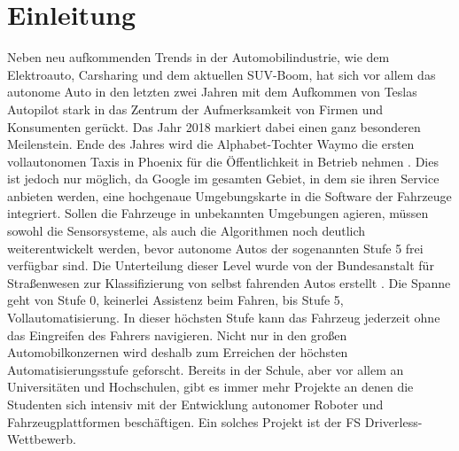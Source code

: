 \documentclass{like}
\begin{document}
  








\setcounter{page}{1}   %

\chapter{Einleitung}
Neben neu aufkommenden Trends in der Automobilindustrie, wie dem Elektroauto, Carsharing und dem aktuellen SUV-Boom, hat sich vor allem das autonome Auto in den letzten zwei Jahren mit dem Aufkommen von Teslas Autopilot stark in das Zentrum der Aufmerksamkeit von Firmen und Konsumenten gerückt. Das Jahr 2018 markiert dabei einen ganz besonderen Meilenstein. 
Ende des Jahres wird die Alphabet-Tochter Waymo die ersten vollautonomen Taxis in Phoenix für die Öffentlichkeit in Betrieb nehmen \cite{Waymo:1}. 
Dies ist jedoch nur möglich, da Google im gesamten Gebiet, in dem sie ihren Service anbieten werden, eine hochgenaue Umgebungskarte in die Software der Fahrzeuge integriert. Sollen die Fahrzeuge in unbekannten Umgebungen agieren, müssen sowohl die Sensorsysteme, als auch die Algorithmen noch deutlich weiterentwickelt werden, bevor autonome Autos der sogenannten Stufe 5 frei verfügbar sind. Die Unterteilung dieser Level wurde von der Bundesanstalt für Straßenwesen zur Klassifizierung von selbst fahrenden Autos erstellt \cite{BASt5L}. Die Spanne geht von Stufe 0, keinerlei Assistenz beim Fahren, bis Stufe 5, Vollautomatisierung. In dieser höchsten Stufe kann das Fahrzeug jederzeit ohne das Eingreifen des Fahrers navigieren. 
Nicht nur in den großen Automobilkonzernen wird deshalb zum Erreichen der höchsten Automatisierungsstufe geforscht. Bereits in der Schule, aber vor allem an Universitäten und Hochschulen, gibt es immer mehr Projekte an denen die Studenten sich intensiv mit der Entwicklung autonomer Roboter und Fahrzeugplattformen beschäftigen. Ein solches Projekt ist der \ac{FS} Driverless-Wettbewerb.
\end{document}

